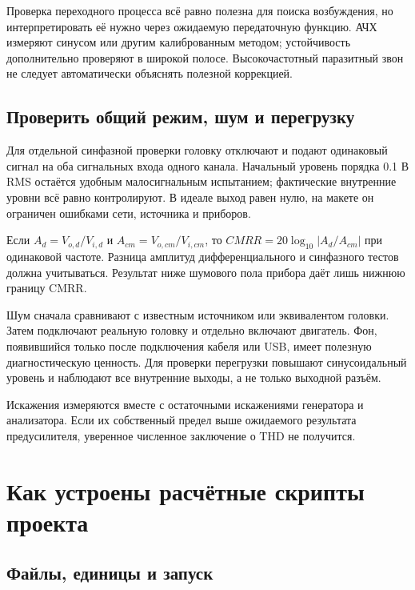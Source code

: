 \documentclass[a4paper,11pt]{article}
\begin{document}
Проверка переходного процесса всё равно полезна для поиска возбуждения,
но интерпретировать её нужно через ожидаемую передаточную функцию.
АЧХ измеряют синусом или другим калиброванным методом; устойчивость дополнительно
проверяют в широкой полосе. Высокочастотный паразитный звон не следует
автоматически объяснять полезной коррекцией.

\subsection{Проверить общий режим, шум и перегрузку}

Для отдельной синфазной проверки головку отключают и подают одинаковый сигнал
на оба сигнальных входа одного канала. Начальный уровень порядка 0.1 В RMS
остаётся удобным малосигнальным испытанием; фактические внутренние уровни всё
равно контролируют. В идеале выход равен нулю, на макете он ограничен ошибками
сети, источника и приборов.

Если $A_d=V_{o,d}/V_{i,d}$ и $A_{cm}=V_{o,cm}/V_{i,cm}$, то
$CMRR=20\log_{10}|A_d/A_{cm}|$ при одинаковой частоте.
Разница амплитуд дифференциального и синфазного тестов должна учитываться.
Результат ниже шумового пола прибора даёт лишь нижнюю границу CMRR.

Шум сначала сравнивают с известным источником или эквивалентом головки.
Затем подключают реальную головку и отдельно включают двигатель.
Фон, появившийся только после подключения кабеля или USB, имеет полезную
диагностическую ценность. Для проверки перегрузки повышают синусоидальный
уровень и наблюдают все внутренние выходы, а не только выходной разъём.

Искажения измеряются вместе с остаточными искажениями генератора и анализатора.
Если их собственный предел выше ожидаемого результата предусилителя,
уверенное численное заключение о THD не получится.

\section{Как устроены расчётные скрипты проекта}

\subsection{Файлы, единицы и запуск}
\end{document}
